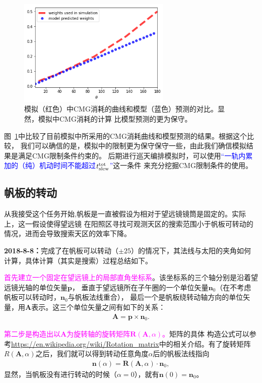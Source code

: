 \documentclass[a4paper,11pt]{ctexart}
\newcommand{\BT}[1]{\textcolor{blue}{#1}}
\newcommand{\MT}[1]{\textcolor{magenta}{#1}}
\begin{document}
\begin{figure}[h!]
\centering
\includegraphics[width=0.65\textwidth]{figures/cmg_rot4.png}
\caption{模拟（红色）中CMG消耗的曲线和模型（蓝色）预测的对比。显然，模拟中CMG消耗的计算
比模型预测的更为保守。}
\label{fig:cmg_rot3}
\end{figure}

图~\ref{fig:cmg_rot3}中比较了目前模拟中所采用的CMG消耗曲线和模型预测的结果。根据这个比较，
我们可以确信的是，模拟中的限制更为保守保守一些，由此我们确信模拟结果是满足CMG限制条件约束的。
后期进行巡天编排模拟时，可以使用\BT{“一轨内累加的（纯）机动时间不能超过$t^{\rm tot}_{\rm slew}$”}这一条件
来充分挖掘CMG限制条件的使用。


\subsection{帆板的转动}
\label{sub:panel}
从我接受这个任务开始,帆板是一直被假设为相对于望远镜镜筒是固定的。实际上，这一假设使得望远镜
在阳照区寻找可观测天区的搜索范围小于帆板可转动的情况，进而会导致搜索天区的效率下降。

\textbf{2018-8-8：}完成了在帆板可以转动（$\pm 25$\textdegree）的情况下，其法线与太阳的夹角如何
计算，具体计算（其实是搜索）过程总结如下。

\MT{\heiti 首先建立一个固定在望远镜上的局部直角坐标系}。该坐标系的三个轴分别是沿着望远镜光轴的单位矢量$\bm{p}$，
垂直于望远镜所在子午圈的一个单位矢量$\bm{n}_{0}$（在不考虑帆板可以转动时，$\bm{n}_{0}$与帆板法线重合），
最后一个是帆板绕转动轴方向的单位矢量，用$\bm{A}$表示。这三个单位矢量之间有如下的关系：
\begin{eqnarray}
\bm{A}=\bm{p}\times\bm{n}_{0}.
\end{eqnarray}

\MT{\heiti 第二步是构造出以$\bm{A}$为旋转轴的旋转矩阵$\bm{R}(\bm{A},\alpha)$。}矩阵的具体
构造公式可以参考\url{https://en.wikipedia.org/wiki/Rotation_matrix}中的相关介绍。有了旋转矩阵
$R(\bm{A},\alpha)$之后，我们就可以得到转动任意角度$\alpha$后的帆板法线指向
\begin{eqnarray}
\bm{n}(\alpha) = \bm{R}(\bm{A},\alpha)\cdot\bm{n}_{0},
\end{eqnarray}
显然，当帆板没有进行转动的时候（$\alpha=0$），就有$\bm{n}(0)=\bm{n}_{0}$。
\end{document}
